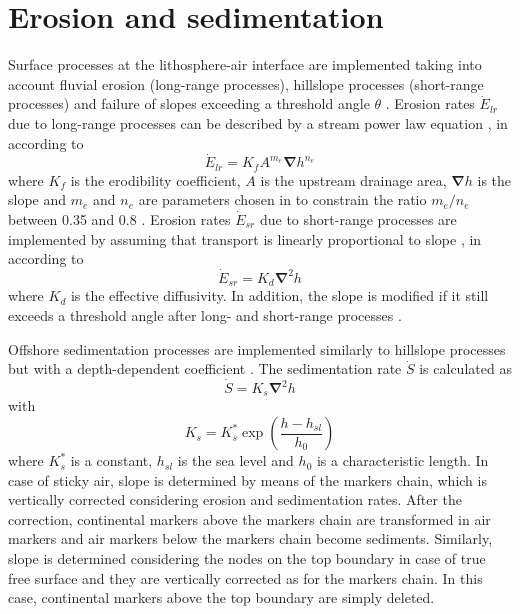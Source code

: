 \documentclass[hidelinks,10pt,a4paper]{article}
\begin{document}
\section{Erosion and sedimentation}\label{sec:erosion}
Surface processes at the lithosphere-air interface are implemented taking into account fluvial erosion (long-range processes), hillslope processes (short-range
processes) and failure of slopes exceeding a threshold angle $\theta$ \citep{Burov1997,Tucker1999,Sacek2012,Croissant2014,Ueda2015,Beucher2020}. Erosion rates
$\dot{E}_{lr}$ due to long-range processes can be described by a stream power law equation \citep{Tucker1999,Ueda2015,Beucher2020}, in according to
\begin{equation}
\dot{E}_{lr}=K_f A^{m_e} \bm{\nabla} h^{n_e}
\end{equation}
where $K_f$ is the erodibility coefficient, $A$ is the upstream drainage area, $\bm{\nabla} h$ is the slope and $m_e$ and $n_e$ are parameters chosen in to
constrain the ratio $m_e/n_e$ between 0.35 and 0.8 \citep{Croissant2014,Ueda2015,Beucher2020}. Erosion rates $\dot{E}_{sr}$ due to short-range processes are
implemented by assuming that transport is linearly proportional to slope \citep{Burov1997,Ueda2015,Beucher2020}, in according to
\begin{equation}
\dot{E}_{sr}=K_d \bm{\nabla}^2 h
\end{equation}
where $K_d$ is the effective diffusivity. In addition, the slope is modified if it still exceeds a threshold angle after long- and short-range processes
\citep{Ueda2015}.

Offshore sedimentation processes are implemented similarly to hillslope processes but with a depth-dependent coefficient \citep{Sacek2012,Beucher2020}.
The sedimentation rate $\dot{S}$ is calculated as
\begin{equation}
\dot{S}=K_s \bm{\nabla}^2 h
\end{equation}
with
\begin{equation}
K_s=K^*_s \exp\left(\frac{h-h_{sl}}{h_0}\right)
\end{equation}
where $K^*_s$ is a constant, $h_{sl}$ is the sea level and $h_0$ is a characteristic length. In case of sticky air, slope is determined by means of the markers
chain, which is vertically corrected considering erosion and sedimentation rates. After the correction, continental markers above the markers chain are
transformed in air markers and air markers below the markers chain become sediments. Similarly, slope is determined considering the nodes on the top boundary
in case of true free surface and they are vertically corrected as for the markers chain. In this case, continental markers above the top boundary are simply
deleted.
\end{document}

